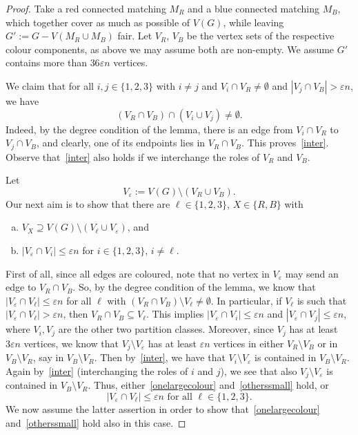 \documentclass[a4paper,10pt]{article}
\let\eps\varepsilon
\begin{document}
\begin{proof}
Take a red connected matching $M_R$ and a blue connected matching $M_B$, which together cover as much as possible of  $V(G)$, while leaving $G':=G-V(M_R\cup M_B)$ fair. Let $V_R$, $V_B$ be the vertex sets of the respective colour components, as above we may assume both are non-empty. We assume $G'$ contains more than $36\eps n$ vertices. 

We claim that for all $i,j\in\{1,2,3\}$ with $i\neq j$ and $V_i\cap V_R\neq\emptyset$ and $|V_j\cap V_B| > \eps n$, we have
\begin{equation}\label{inter}
(V_R\cap V_B)\cap (V_i\cup V_j)\neq \emptyset.
\end{equation}
Indeed, by the degree condition of the lemma, there is an edge from $V_i\cap V_R$ to $V_j\cap V_B$, and clearly, one of its endpoints lies in $V_R\cap V_B$. This proves~\eqref{inter}. Observe that~\eqref{inter} also holds if we interchange the roles of $V_R$ and $V_B$.

Let $$V_\eps:=V(G)\setminus (V_R\cup V_B).$$
Our next aim is to show that 
there are $\ell\in\{1,2,3\}$, $X\in\{R,B\}$ with 
\begin{enumerate}[(a)]
\item $V_X\supseteq V(G)\setminus (V_\ell\cup V_\eps)$, and\label{onelargecolour}
\item $|V_\eps\cap V_i|\leq\eps n$ for $i\in\{1,2,3\}$, $i\neq\ell$.\label{otherssmall}
\end{enumerate}

First of all, since all edges are coloured,
note that no vertex in $V_\eps$ may send an edge to $V_R\cap V_B$. So, by the degree condition of the lemma, we know that 
$|V_\eps\cap V_\ell|\leq \eps n$ for all $\ell$ with $(V_R\cap V_B)\setminus V_\ell\neq\emptyset$.
In particular, if $V_\ell$ is such that $|V_\eps\cap V_\ell|> \eps n$, then $V_R \cap V_B \subseteq V_\ell$.
This implies $|V_\eps\cap V_i|\leq \eps n$ and $|V_\eps\cap V_j|\leq \eps n$, where $V_i, V_j$ are the other two partition classes. Moreover, since $V_j$ has at least $3\eps n$ vertices, we know that $V_j\setminus V_\eps$ has at least $\eps n$ vertices in either $V_R\setminus V_B$ or in $V_B\setminus V_R$, say in $V_B\setminus V_R$. Then by~\eqref{inter}, we have that $ V_i\setminus V_\eps$ is contained in $V_B\setminus V_R$. Again by~\eqref{inter} (interchanging the roles of $i$ and $j$), we see that also $ V_j\setminus V_\eps$ is contained in $V_B\setminus V_R$.  Thus, either~\eqref{onelargecolour} and~\eqref{otherssmall} hold, or
\begin{equation}\label{allsmallor}
\text{$|V_\eps\cap V_\ell|\leq \eps n$ for all $\ell\in\{1,2,3\}$.}
\end{equation}
We now assume the latter assertion in order to show that~\eqref{onelargecolour} and~\eqref{otherssmall} hold also in this case.


\end{proof}
\end{document}
